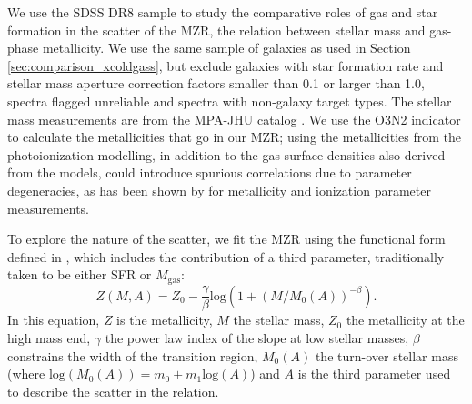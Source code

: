 \documentclass[fleqn,usenatbib]{mnras}
\begin{document}
We use the SDSS DR8 sample to study the comparative roles of gas and star formation in the scatter of the MZR, the relation between stellar mass and gas-phase metallicity. We use the same sample of galaxies as used in Section \ref{sec:comparison_xcoldgass}, but exclude galaxies with star formation rate and stellar mass aperture correction factors smaller than 0.1 or larger than 1.0, spectra flagged unreliable and spectra with non-galaxy target types. The stellar mass measurements are from the MPA-JHU catalog \citep{kauffmann2003a}. We use the \cite{pettini2004} O3N2 indicator to calculate the metallicities that go in our MZR; using the metallicities from the photoionization modelling, in addition to the gas surface densities also derived from the models, could introduce spurious correlations due to parameter degeneracies, as has been shown by \cite{mingozzi2020} for metallicity and ionization parameter measurements.

To explore the nature of the scatter, we fit the MZR using the functional form defined in \cite{curti2020}, which includes the contribution of a third parameter, traditionally taken to be either SFR or $M_{\textrm{gas}}$:
\begin{equation}
\label{eq:mass_metallicity_scatter_function}
    Z(M, A) = Z_0 - \frac{\gamma}{\beta} \mathrm{log}(1 + (M/M_0(A))^{-\beta} ) .
\end{equation}
In this equation, $Z$ is the metallicity, $M$ the stellar mass, $Z_0$ the metallicity at the high mass end, $\gamma$ the power law index of the slope at low stellar masses, $\beta$ constrains the width of the transition region, $M_0(A)$ the turn-over stellar mass (where $\textrm{log}(M_0(A)) = m_0 + m_1\textrm{log}(A)$) and $A$ is the third parameter used to describe the scatter in the relation.
\end{document}
